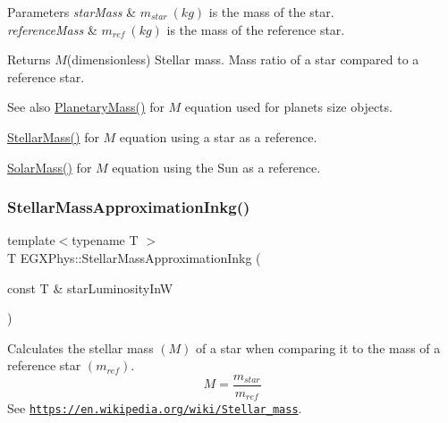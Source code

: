 \begin{DoxyParams}{Parameters}
{\em star\+Mass} & $m_{star}\ (kg)$ is the mass of the star. \\
\hline
{\em reference\+Mass} & $m_{ref}\ (kg)$ is the mass of the reference star. \\
\hline
\end{DoxyParams}
\begin{DoxyReturn}{Returns}
$M$(dimensionless) Stellar mass. Mass ratio of a star compared to a reference star. 
\end{DoxyReturn}
\begin{DoxySeeAlso}{See also}
\mbox{\hyperlink{group___e_g_x_phys-_planetary_mass_ga225bcf56fb37468f6d4d46493d403503}{Planetary\+Mass()}} for $M$ equation used for planets size objects. 

\mbox{\hyperlink{group___e_g_x_phys-_stellar_mass_gabbd6081cd3bfb0153d7470d58f733a61}{Stellar\+Mass()}} for $M$ equation using a star as a reference. 

\mbox{\hyperlink{group___e_g_x_phys-_stellar_mass_gac393d64d586be3dc76ac7a98ac336514}{Solar\+Mass()}} for $M$ equation using the Sun as a reference. 
\end{DoxySeeAlso}
\mbox{\label{group___e_g_x_phys-_stellar_mass_ga21d4a1964c4fada8367804113d9f3123}} 
\subsubsection{\texorpdfstring{Stellar\+Mass\+Approximation\+Inkg()}{StellarMassApproximationInkg()}}
{\footnotesize\ttfamily template$<$typename T $>$ \\
T E\+G\+X\+Phys\+::\+Stellar\+Mass\+Approximation\+Inkg (\begin{DoxyParamCaption}\item[{const T \&}]{star\+Luminosity\+InW }\end{DoxyParamCaption})}



Calculates the stellar mass $(M)$ of a star when comparing it to the mass of a reference star $(m_{ref})$. \[M=\frac{m_{star}}{m_{ref}}\] See \href{https://en.wikipedia.org/wiki/Stellar_mass}{\tt https\+://en.\+wikipedia.\+org/wiki/\+Stellar\+\_\+mass}. 


